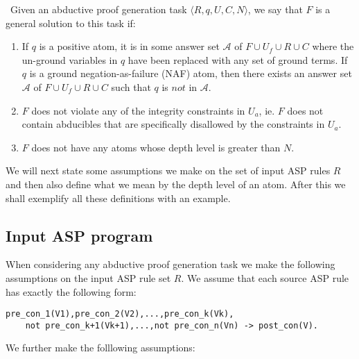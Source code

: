 \begin{definition}\label{def:abductive_proof_generation_solution} \
Given an abductive proof generation task $\langle R,q,U,C,N \rangle$, we say that $F$ is a general solution to this task if:
\begin{enumerate}
    \item If $q$ is a positive atom, it is in some answer set $\mathcal{A}$ of $F\cup U_{f}\cup R\cup C$ where the un-ground variables in $q$ have been replaced with any set of ground terms. If $q$ is a ground negation-as-failure (NAF) atom, then there exists an answer set $\mathcal{A}$ of $F\cup U_{f}\cup R\cup C$ such that $q$ is $not$ in $\mathcal{A}$.
    \item $F$ does not violate any of the integrity constraints in $U_{a}$, ie. $F$ does not contain abducibles that are specifically disallowed by the constraints in $U_{a}$.
    \item $F$ does not have any atoms whose depth level is greater than $N$.
\end{enumerate}
\end{definition} We will next state some assumptions we make on the set of input ASP rules $R$ and then also define what we mean by the depth level of an atom. After this we shall exemplify all these definitions with an example. 
\subsection{Input ASP program}
When considering any abductive proof generation task we make the following assumptions on the input ASP rule set $R$. We assume that each source ASP rule has exactly the following form:
\begin{lstlisting}[frame=none]
pre_con_1(V1),pre_con_2(V2),...,pre_con_k(Vk),
    not pre_con_k+1(Vk+1),...,not pre_con_n(Vn) -> post_con(V).
\end{lstlisting}
We further make the folllowing assumptions:

